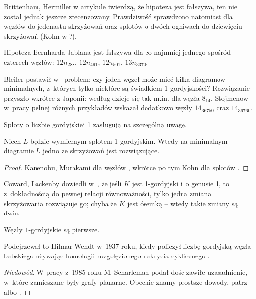 Brittenham, Hermiller w artykule \cite{brittenham17} twierdzą, że hipoteza jest fałszywa, ten nie został jednak jeszcze zrecenzowany.
Prawdziwość sprawdzono natomiast dla węzłów do jedenastu skrzyżowań oraz splotów o dwóch ogniwach do dziewięciu skrzyżowań (Kohn w \cite{kohn93}?).

\begin{example}
    Hipoteza Bernharda-Jablana jest fałszywa dla co najmniej jednego spośród czterech węzłów: $12n_{288}$, $12n_{491}$, $12n_{501}$, $13n_{3370}$.
\end{example}

Bleiler postawił w~\cite{bleiler84} problem: czy jeden węzeł może mieć kilka diagramów minimalnych, z~których tylko niektóre są świadkiem $1$-gordyjskości?
Rozwiązanie przyszło wkrótce z Japonii: według \cite{kanenobumurakami86} dzieje się tak m.in. dla węzła $8_{14}$.
Stojmenow w~pracy \cite{stoimenow01} pełnej różnych przykładów wskazał dodatkowo węzły $14_{36750}$ oraz $14_{36760}$.

Sploty o liczbie gordyjskiej 1 zasługują na szczególną uwagę.

\begin{proposition}
    Niech $L$ będzie wymiernym splotem 1-gordyjskim.
%
    Wtedy na minimalnym diagramie $L$ jedno ze skrzyżowań jest rozwiązujące.
\end{proposition}

\begin{proof}
    Kanenobu, Murakami dla węzłów \cite{kanenobumurakami86}, wkrótce po tym Kohn dla splotów \cite{kohn91}.
\end{proof}

Coward, Lackenby dowiedli w~\cite{coward11}, że jeśli $K$ jest 1-gordyjski i~o genusie 1, to z~dokładnością do pewnej relacji równoważności, tylko jedna zmiana skrzyżowania rozwiązuje go; chyba że $K$ jest ósemką -- wtedy takie zmiany są dwie.

\begin{proposition}
    \label{prp:unknotting_one_prime}
    Węzły $1$-gordyjskie są pierwsze.
\end{proposition}

Podejrzewał to Hilmar Wendt w~1937 roku, kiedy policzył liczbę gordyjską węzła babskiego używając homologii rozgałęzionego nakrycia cyklicznego \cite{wendt37}.

\begin{proof}[Niedowód]
    W pracy \cite{scharleman85} z~1985 roku M. Scharleman podał dość zawiłe uzasadnienie, w~które zamieszane były grafy planarne.
    Obecnie znamy prostsze dowody, patrz \cite{lackenby97} albo \cite{zhang91}.
\end{proof}

